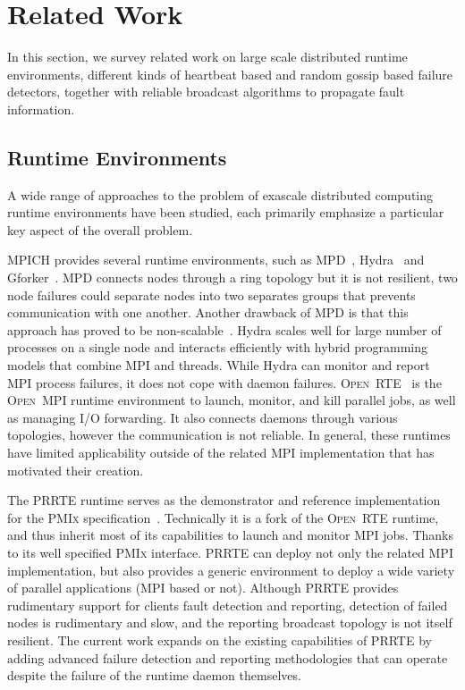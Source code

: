 \documentclass[sigconf]{acmart}
\newcommand{\prrte}[0]{\textsc{PRRTE}\xspace}
\newcommand{\pmix}[0]{\textsc{PMIx}\xspace}
\newcommand{\orte}[0]{\textsc{Open~RTE}\xspace}
\newcommand{\ompi}[0]{\textsc{Open~MPI}\xspace}
\newcommand{\mpi}[0]{\textsc{MPI}\xspace}
\begin{document}
\section{Related Work}\label{sec:related}
In this section, we survey related work on large scale distributed runtime environments, different kinds of heartbeat based and random gossip based failure detectors, together with reliable broadcast algorithms to propagate fault information.

\subsection{Runtime Environments}
A wide range of approaches to the problem of exascale distributed computing runtime environments have been studied, each primarily emphasize a particular key aspect of the overall problem. 

MPICH provides several runtime environments, such as MPD~\cite{Butler00}, Hydra~\cite{MPICH14} and Gforker~\cite{MPICH14}. MPD connects nodes through a ring topology but it is not resilient, two node failures could separate nodes into two separates groups that prevents communication with one another. Another drawback of MPD is that this approach has proved to be non-scalable~\cite{Bosilca11}.
Hydra scales well for large number of processes on a single node and interacts efficiently with hybrid programming models that combine \mpi and threads. While Hydra can monitor
and report MPI process failures, it does not cope with daemon failures. 
%
 \orte~\cite{Castain05, Jeffrey12} is the \ompi runtime environment to launch, monitor, and kill parallel jobs, as well as managing I/O forwarding. It also connects daemons through various topologies, however the communication is not reliable. In general, these runtimes have limited applicability outside of the related \mpi implementation that has motivated their creation.

The \prrte runtime serves as the demonstrator and reference implementation
for the \pmix specification~\cite{CASTAIN18}. Technically it is a fork of
the \orte runtime, and thus inherit most of its capabilities to launch
and monitor \mpi jobs. Thanks to its well specified \pmix interface. \prrte
can deploy not only the related \mpi implementation, but also provides a
generic environment to deploy a wide variety of parallel applications (MPI based or not).
Although \prrte provides rudimentary support for clients fault detection and reporting, 
detection of failed nodes is rudimentary and slow, and the reporting 
broadcast topology is not itself resilient. 
The current work expands on the existing capabilities of \prrte by adding
advanced failure detection and reporting methodologies that can operate 
despite the failure of the runtime daemon themselves.
\end{document}
